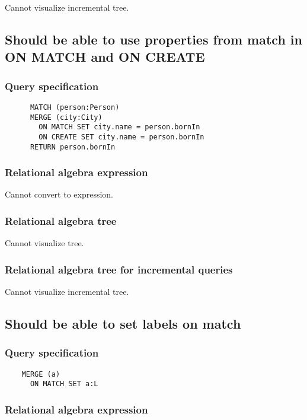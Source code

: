	Cannot visualize incremental tree.
	\subsection{Should be able to use properties from match in ON MATCH and ON CREATE}

	\subsubsection*{Query specification}

	\begin{lstlisting}
	  MATCH (person:Person)
	  MERGE (city:City)
	    ON MATCH SET city.name = person.bornIn
	    ON CREATE SET city.name = person.bornIn
	  RETURN person.bornIn
	\end{lstlisting}


	\subsubsection*{Relational algebra expression}

	Cannot convert to expression.

	\subsubsection*{Relational algebra tree}

	Cannot visualize tree.

	\subsubsection*{Relational algebra tree for incremental queries}

	Cannot visualize incremental tree.
	\subsection{Should be able to set labels on match}

	\subsubsection*{Query specification}

	\begin{lstlisting}
	MERGE (a)
	  ON MATCH SET a:L
	\end{lstlisting}


	\subsubsection*{Relational algebra expression}

